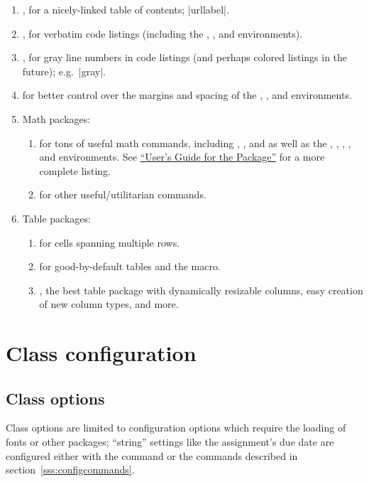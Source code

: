 \documentclass{ltxdoc}
\begin{document}
\begin{enumerate}
\item {}, for a nicely-linked table of contents;
	|{url}{label}|.
\item {}, for verbatim code listings (including the
	, , and  environments).
\item {}, for gray line numbers in code listings (and perhaps
	colored listings in the future); e.g.\ |{gray}|.
\item {} for better control over the margins and spacing of
	the , , and 
	environments.
\item Math packages: \begin{enumerate}
	\item {} for tons of useful math commands, including
		, , and  as well as the ,
		, , , and
		 environments. See
		\href{http://texdoc.net/texmf-dist/doc/latex/amsmath/amsldoc.pdf}{``User's
		Guide for the  Package''} for a more
		complete listing.
	\item {} for other useful/utilitarian commands.
\end{enumerate}
\item Table packages: \begin{enumerate}
	\item {} for cells spanning multiple rows.
	\item {} for good-by-default tables and the 
		macro.
	\item {}, the best table package with dynamically resizable
		columns, easy creation of new column types, and more.
\end{enumerate}
\end{enumerate}

\section{Class configuration}

\subsection{Class options}

Class options are limited to configuration options which require the loading
of fonts or other packages; ``string'' settings like the assignment's due
date are configured either with the  command or the
commands described in section~\ref{sss:configcommands}.
\end{document}
